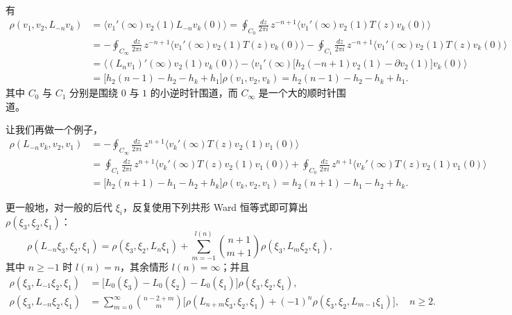 有
\begin{equation}\label{eq:3-10}
  \begin{aligned}
    \rho(v_1,v_2,L_{-n}v_k)
    &=\langle v_1'(\infty)v_2(1)L_{-n}v_k(0)\rangle
     =\oint_{C_0}\frac{dz}{2\pi i}\,z^{-n+1}
      \langle v_1'(\infty)v_2(1)T(z)v_k(0)\rangle\\
    &=-\oint_{C_\infty}\frac{dz}{2\pi i}\,z^{-n+1}
      \langle v_1'(\infty)v_2(1)T(z)v_k(0)\rangle
     -\oint_{C_1}\frac{dz}{2\pi i}\,z^{-n+1}
      \langle v_1'(\infty)v_2(1)T(z)v_k(0)\rangle\\
    &=\langle (L_n v_1)'(\infty)v_2(1)v_k(0)\rangle
     -\langle v_1'(\infty)\bigl[h_2(-n+1)v_2(1)-\partial v_2(1)\bigr]v_k(0)\rangle\\
    &=\bigl[h_2(n-1)-h_2-h_k+h_1\bigr]\rho(v_1,v_2,v_k)
     =h_2(n-1)-h_2-h_k+h_1 .
  \end{aligned}
\end{equation}
其中 $C_0$ 与 $C_1$ 分别是围绕 $0$ 与 $1$ 的小逆时针围道，而 $C_\infty$ 是一个大的顺时针围道。


让我们再做一个例子，
\begin{equation}\label{eq:3-11}
  \begin{aligned}
    \rho(L_{-n}v_k,v_2,v_1)
    &=-\oint_{C_\infty}\frac{dz}{2\pi i}\,z^{n+1}
      \langle v_k'(\infty)T(z)v_2(1)v_1(0)\rangle\\
    &=\oint_{C_1}\frac{dz}{2\pi i}\,z^{n+1}
      \langle v_k'(\infty)T(z)v_2(1)v_1(0)\rangle
     +\oint_{C_0}\frac{dz}{2\pi i}\,z^{n+1}
      \langle v_k'(\infty)T(z)v_2(1)v_1(0)\rangle\\
    &=\bigl[h_2(n+1)-h_1-h_2+h_k\bigr]\rho(v_k,v_2,v_1)
     =h_2(n+1)-h_1-h_2+h_k .
  \end{aligned}
\end{equation}

更一般地，对一般的后代 $\xi_i$，反复使用下列共形 Ward 恒等式即可算出 $\rho(\xi_3,\xi_2,\xi_1)$：
\begin{equation}\label{eq:3-12}
  \rho(L_{-n}\xi_3,\xi_2,\xi_1)
  =\rho(\xi_3,\xi_2,L_n\xi_1)
  +\sum_{m=-1}^{l(n)}\binom{n+1}{m+1}\rho(\xi_3,L_m\xi_2,\xi_1),
\end{equation}
其中 $n\ge-1$ 时 $l(n)=n$，其余情形 $l(n)=\infty$；并且
\begin{equation}\label{eq:3-13}
  \begin{aligned}
    \rho(\xi_3,L_{-1}\xi_2,\xi_1)
    &=\bigl[L_0(\xi_3)-L_0(\xi_2)-L_0(\xi_1)\bigr]\rho(\xi_3,\xi_2,\xi_1),\\
    \rho(\xi_3,L_{-n}\xi_2,\xi_1)
    &=\sum_{m=0}^{\infty}\binom{n-2+m}{m}
      \bigl[\rho(L_{n+m}\xi_3,\xi_2,\xi_1)
      +(-1)^n\rho(\xi_3,\xi_2,L_{m-1}\xi_1)\bigr],
      \quad n\ge 2 .
  \end{aligned}
\end{equation}

